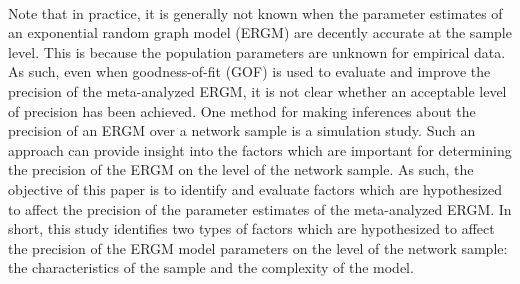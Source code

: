 \documentclass[a4paper, man, floatsintext]{apa6}
\begin{document}
\\
Note that in practice, it is generally not known when the parameter estimates of an exponential random graph model (ERGM) are decently accurate at the sample level. This is because the population parameters are unknown for empirical data. As such, even when goodness-of-fit (GOF) is used to evaluate and improve the precision of the meta-analyzed ERGM, it is not clear whether an acceptable level of precision has been achieved. One method for making inferences about the precision of an ERGM over a network sample is a simulation study. Such an approach can provide insight into the factors which are important for determining the precision of the ERGM on the level of the network sample. As such, the objective of this paper is to identify and evaluate factors which are hypothesized to affect the precision of the parameter estimates of the meta-analyzed ERGM. In short, this study identifies two types of factors which are hypothesized to affect the precision of the ERGM model parameters on the level of the network sample: the characteristics of the sample and the complexity of the model. 
\\
\end{document}
